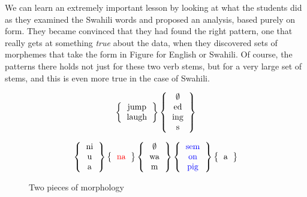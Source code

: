 \documentclass[output=paper,colorlinks,citecolor=brown]{langscibook}
\begin{document}
We can learn an extremely important lesson by looking at what the students did as they examined the Swahili words and proposed an analysis, based purely on form. They became convinced that they had found the right pattern, one that really gets at something \textit{true} about the data,  when they discovered sets of morphemes that take the form in Figure  for English or  Swahili. Of course, the patterns there holds not just for these two verb stems, but for a very large set of stems, and this is even more true in the case of Swahili.

\begin{figure}
  \[ \left\{ \begin{tabular}{c} jump \\ laugh  \end{tabular} \right\}  \left\{ \begin{tabular}{c} $\emptyset$ \\ed\\ing\\s \end{tabular}  \right\}
\]

 \[ \left\{ 
\begin{tabular}{c} 
ni \\ u \\ a 
\end{tabular} 
\right\}
\left\{ 
\begin{tabular}{c}
\textcolor{red}{na} 
\end{tabular}  
\right\}  
\left\{ 
\begin{tabular}{c} 
$\emptyset$ \\ wa  \\ m 
\end{tabular} 
\right\} 
\left\{ 
\begin{tabular}{c} 
\textcolor{blue}{sem} \\ \textcolor{blue}{on} \\ \textcolor{blue}{pig}  
\end{tabular}  
\right\}
\left\{ 
\begin{tabular}{c}
a 
\end{tabular}  
\right\} 
\]
\caption{Two pieces of morphology}
\label{morphology}
\end{figure}
 


 
\end{document}
